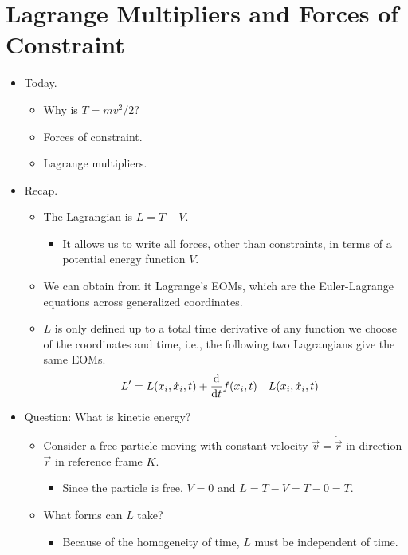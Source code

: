 \documentclass[../notes.tex]{subfiles}
\begin{document}
\section{Lagrange Multipliers and Forces of Constraint}
\begin{itemize}
    \item {}Today.
    \begin{itemize}
        \item Why is $T=mv^2/2$?
        \item Forces of constraint.
        \item Lagrange multipliers.
    \end{itemize}
    \item Recap.
    \begin{itemize}
        \item The Lagrangian is $L=T-V$.
        \begin{itemize}
            \item It allows us to write all forces, other than constraints, in terms of a potential energy function $V$.
        \end{itemize}
        \item We can obtain from it Lagrange's EOMs, which are the Euler-Lagrange equations across generalized coordinates.
        \item $L$ is only defined up to a total time derivative of any function we choose of the coordinates and time, i.e., the following two Lagrangians give the same EOMs.
        \begin{align*}
            L' &= L(x_i,\dot{x}_i,t)+\dv{t}f(x_i,t)&
            &L(x_i,\dot{x}_i,t)
        \end{align*}
    \end{itemize}
    \item Question: What is kinetic energy?
    \begin{itemize}
        \item Consider a free particle moving with constant velocity $\vec{v}=\dot{\vec{r}}$ in direction $\vec{r}$ in reference frame $K$.
        \begin{itemize}
            \item Since the particle is free, $V=0$ and $L=T-V=T-0=T$.
        \end{itemize}
        \item What forms can $L$ take?
        \begin{itemize}
            \item Because of the homogeneity of time, $L$ must be independent of time.

\end{itemize}
\end{itemize}
\end{itemize}
\end{document}
